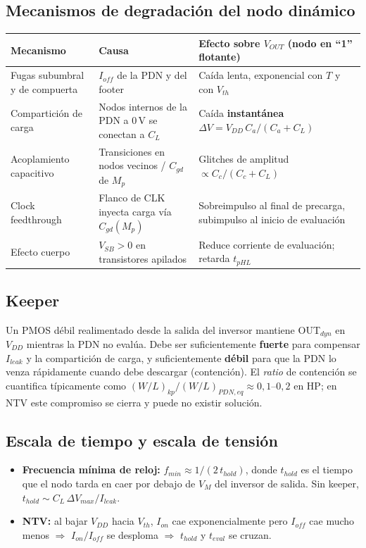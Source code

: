 \documentclass[11pt,a4paper]{article}
\begin{document}
\subsection{Mecanismos de degradación del nodo dinámico}
\begin{center}\small
\begin{tabular}{@{}p{3.4cm}p{5cm}p{6.6cm}@{}}
\toprule
\textbf{Mecanismo} & \textbf{Causa} & \textbf{Efecto sobre $V_{OUT}$ (nodo en ``1'' flotante)}\\
\midrule
Fugas subumbral y de compuerta & $I_{off}$ de la PDN y del footer & Caída lenta, exponencial con $T$ y con $V_{th}$\\
Compartición de carga & Nodos internos de la PDN a 0\,V se conectan a $C_L$ & Caída \textbf{instantánea} $\Delta V = V_{DD}\,C_a/(C_a+C_L)$\\
Acoplamiento capacitivo & Transiciones en nodos vecinos / $C_{gd}$ de $M_p$ & Glitches de amplitud $\propto C_c/(C_c+C_L)$\\
Clock feedthrough & Flanco de CLK inyecta carga vía $C_{gd}(M_p)$ & Sobreimpulso al final de precarga, subimpulso al inicio de evaluación\\
Efecto cuerpo & $V_{SB}>0$ en transistores apilados & Reduce corriente de evaluación; retarda $t_{pHL}$\\
\bottomrule
\end{tabular}
\end{center}

\subsection{Keeper}
Un PMOS débil realimentado desde la salida del inversor mantiene OUT$_{dyn}$ en $V_{DD}$ mientras la PDN no evalúa. Debe ser suficientemente \textbf{fuerte} para compensar $I_{leak}$ y la compartición de carga, y suficientemente \textbf{débil} para que la PDN lo venza rápidamente cuando debe descargar (contención). El \emph{ratio} de contención se cuantifica típicamente como $(W/L)_{kp}/(W/L)_{PDN,eq}\approx 0{,}1$--$0{,}2$ en HP; en NTV este compromiso se cierra y puede no existir solución.

\subsection{Escala de tiempo y escala de tensión}
\begin{itemize}[nosep]
  \item \textbf{Frecuencia mínima de reloj:} $f_{min}\approx 1/(2\,t_{hold})$, donde $t_{hold}$ es el tiempo que el nodo tarda en caer por debajo de $V_M$ del inversor de salida. Sin keeper, $t_{hold}\sim C_L\,\Delta V_{max}/I_{leak}$.
  \item \textbf{NTV:} al bajar $V_{DD}$ hacia $V_{th}$, $I_{on}$ cae exponencialmente pero $I_{off}$ cae mucho menos $\Rightarrow$ $I_{on}/I_{off}$ se desploma $\Rightarrow$ $t_{hold}$ y $t_{eval}$ se cruzan.
\end{itemize}
\end{document}
